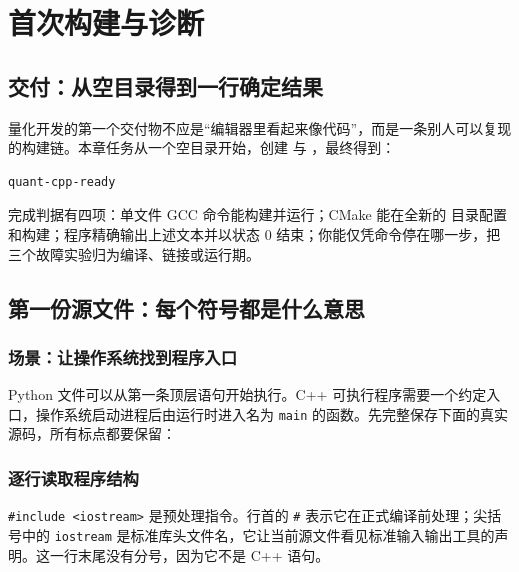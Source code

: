 \chapter{首次构建与诊断}


\section{交付：从空目录得到一行确定结果}

量化开发的第一个交付物不应是“编辑器里看起来像代码”，而是一条别人可以复现的构建链。本章任务从一个空目录开始，创建  与 ，最终得到：

\begin{lstlisting}[numbers=none]
quant-cpp-ready
\end{lstlisting}

完成判据有四项：单文件 GCC 命令能构建并运行；CMake 能在全新的  目录配置和构建；程序精确输出上述文本并以状态 0 结束；你能仅凭命令停在哪一步，把三个故障实验归为编译、链接或运行期。

\section{第一份源文件：每个符号都是什么意思}

\subsection{场景：让操作系统找到程序入口}

Python 文件可以从第一条顶层语句开始执行。C++ 可执行程序需要一个约定入口，操作系统启动进程后由运行时进入名为 \texttt{main} 的函数。先完整保存下面的真实源码，所有标点都要保留：



\subsection{逐行读取程序结构}

\texttt{\#include <iostream>} 是预处理指令。行首的 \texttt{\#} 表示它在正式编译前处理；尖括号中的 \texttt{iostream} 是标准库头文件名，它让当前源文件看见标准输入输出工具的声明。这一行末尾没有分号，因为它不是 C++ 语句。

